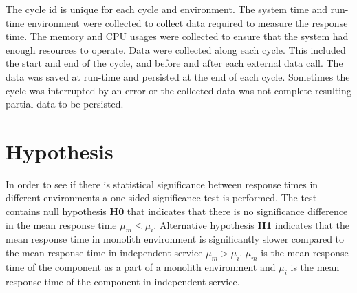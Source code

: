 The cycle id is unique for each cycle and environment.
The system time and run-time environment were collected to collect data required to measure the response time.
The memory and CPU usages were collected to ensure that the system had enough resources to operate.
Data were collected along each cycle.
This included the start and end of the cycle, and before and after each external data call.
The data was saved at run-time and persisted at the end of each cycle.
Sometimes the cycle was interrupted by an error or the collected data was not complete resulting partial data to be persisted.

\section{Hypothesis}
In order to see if there is statistical significance between response times in different environments a one sided significance test is performed.
The test contains null hypothesis \textbf{H0} that indicates that there is no significance difference in the mean response time $\mu_m\le\mu_i$.
Alternative hypothesis \textbf{H1} indicates that the mean response time in monolith environment is significantly slower compared to the mean response time in independent service $\mu_m>\mu_i$.
$\mu_m$ is the mean response time of the component as a part of a monolith environment and $\mu_i$ is the mean response time of the component in independent service.


